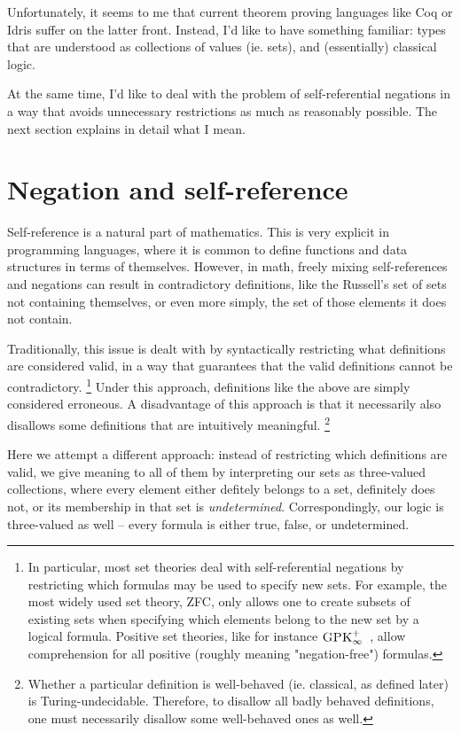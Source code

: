 \documentclass[oneside,12pt]{book}
\theoremstyle{definition}
\theoremstyle{remark}
\newcommand{\GPKInf}{\textsc{GPK}^+_\infty}
\begin{document}
Unfortunately, it seems to me that current theorem proving languages like Coq or
Idris suffer on the latter front.
Instead, I'd like to have something familiar: types that are understood
as collections of values (ie. sets), and (essentially) classical logic.

At the same time, I'd like to deal with the problem of self-referential negations
in a way that avoids unnecessary restrictions as much as reasonably possible.
The next section explains in detail what I mean.

\section{Negation and self-reference}

Self-reference is a natural part of mathematics.
This is very explicit in programming languages, where it is common to define
functions and data structures in terms of themselves.
However, in math, freely mixing self-references and negations can result
in contradictory definitions, like the Russell's set of sets not containing
themselves, or even more simply, the set of those elements it does not contain.

Traditionally, this issue is dealt with by syntactically restricting what
definitions are considered valid, in a way that guarantees that the valid
definitions cannot be contradictory.%
%
\footnote{In particular, most set theories deal with self-referential negations
by restricting which formulas may be used to specify new sets. For example,
the most widely used set theory, ZFC, only allows one to create subsets
of existing sets when specifying which elements belong to the new set by a logical
formula. Positive set theories, like for instance $\GPKInf$~\cite{ConPosTheory},
allow comprehension for all positive (roughly meaning "negation-free") formulas.}
%
Under this approach, definitions like the above are simply considered erroneous.
A disadvantage of this approach is that it necessarily also disallows some
definitions that are intuitively meaningful.%
%
\footnote{Whether a particular definition is well-behaved (ie. classical, as defined
later) is Turing-undecidable. Therefore, to disallow all badly behaved definitions,
one must necessarily disallow some well-behaved ones as well.}

Here we attempt a different approach: instead of restricting which definitions
are valid, we give meaning to all of them by  interpreting our sets as three-valued
collections, where every element either defitely belongs to a set, definitely
does not, or its membership in that set is \textit{undetermined}.
Correspondingly, our logic is three-valued as well -- every formula is either true,
false, or undetermined.
\end{document}
